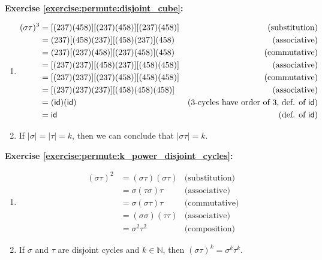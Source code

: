 \noindent\textbf{Exercise \ref{exercise:permute:disjoint_cube}:}
\begin{enumerate}[{a.}]
\item
\begin{align*}
(\sigma\tau)^3 &= [(237)(458)][(237)(458)][(237)(458)] &\text{(substitution)}
\\
&= (237)[(458)(237)][(458)(237)](458) &\text{(associative)}
\\
&= (237)[(237)(458)][(237)(458)](458) &\text{(commutative)}
\\
&= [(237)(237)][(458)(237)][(458)(458)] &\text{(associative)}
\\
&= [(237)(237)][(237)(458)][(458)(458)] &\text{(commutative)}
\\
&= [(237)(237)(237)][(458)(458)(458)] &\text{(associative)}
\\
&= (\sf{id})(\sf{id}) &\text{(3-cycles have order of 3, def. of\ } \sf{id})
\\
&= \sf{id} &\text{(def. of\ } \sf{id})
\end{align*}

\item
If $|\sigma| = |\tau| = k$, then we can conclude that $|\sigma\tau| = k$.
\end{enumerate}

\noindent\textbf{Exercise \ref{exercise:permute:k_power_disjoint_cycles}:}
\begin{enumerate}[{a.}]
\item
\begin{align*}
(\sigma\tau)^2 &= (\sigma\tau)(\sigma\tau) &\text{(substitution)}
\\
&= \sigma(\tau\sigma)\tau &\text{(associative)}
\\
&= \sigma(\sigma\tau)\tau &\text{(commutative)}
\\
& =(\sigma\sigma)(\tau\tau) &\text{(associative)}
\\
& =\sigma^2\tau^2 &\text{(composition)}
\end{align*}

\item
If $\sigma$ and $\tau$ are disjoint cycles and $k \in {\mathbb N}$, then $(\sigma\tau)^k = \sigma^k\tau^k$.
\end{enumerate}

